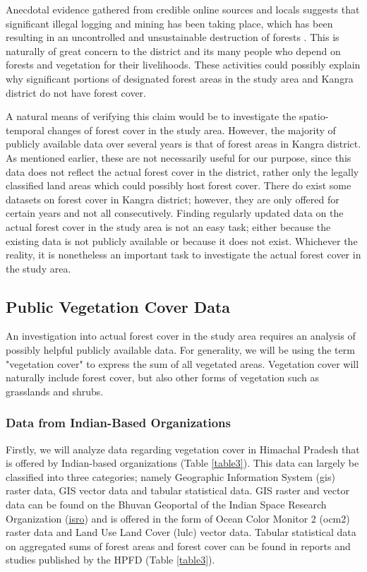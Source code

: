 \justify
Anecdotal evidence gathered from credible online sources and locals suggests that significant illegal logging and mining has been taking place, which has been resulting in an uncontrolled and unsustainable destruction of forests . This is naturally of great concern to the district and its many people who depend on forests and vegetation for their livelihoods. These activities could possibly explain why significant portions of designated forest areas in the study area and Kangra district do not have forest cover. 

\justify
A natural means of verifying this claim would be to investigate the spatio-temporal changes of forest cover in the study area. However, the majority of publicly available data over several years is that of forest areas in Kangra district. As mentioned earlier, these are not necessarily useful for our purpose, since this data does not reflect the actual forest cover in the district, rather only the legally classified land areas which could possibly host forest cover. There do exist some datasets on forest cover in Kangra district; however, they are only offered for certain years and not all consecutively. Finding regularly updated data on the actual forest cover in the study area is not an easy task; either because the existing data is not publicly available or because it does not exist. Whichever the reality, it is nonetheless an important task to investigate the actual forest cover in the study area. 

\subsection{Public Vegetation Cover Data}

\justify
An investigation into actual forest cover in the study area requires an analysis of possibly helpful publicly available data. For generality, we will be using the term "vegetation cover" to express the sum of all vegetated areas. Vegetation cover will naturally include forest cover, but also other forms of vegetation such as grasslands and shrubs.

\subsubsection{Data from Indian-Based Organizations}

\justify
Firstly, we will analyze data regarding vegetation cover in Himachal Pradesh that is offered by Indian-based organizations (Table \ref{table3}). This data can largely be classified into three categories; namely Geographic Information System (\ac{gis}) raster data, GIS vector data and tabular statistical data. GIS raster and vector data can be found on the Bhuvan Geoportal of the Indian Space Research Organization (\href{http://bhuvan.nrsc.gov.in/bhuvan_links.php#}{\ac{isro}}) and is offered in the form of Ocean Color Monitor 2 (\ac{ocm}2) raster data and Land Use Land Cover (\ac{lulc}) vector data. Tabular statistical data on aggregated sums of forest areas and forest cover can be found in reports and studies published by the HPFD (Table \ref{table3}).

